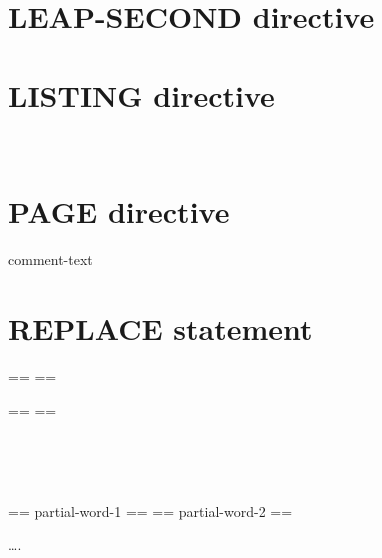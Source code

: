 \begin{0-1}
  \begin{1=}
    \directiveindicator \\
    \miscext{\textdollar}
  \end{1=}
   \sourcetext
\end{0-1}

\begin{0-1}
  \directiveindicator{} \\
\end{0-1}


\section{LEAP-SECOND directive}


\section{LISTING directive}

\directiveindicator{}
\begin{1=}
   \\
\end{1=}

\section{PAGE directive}

\directiveindicator{}
\begin{0-1}
  comment-text
\end{0-1}

\section{REPLACE statement}

\begin{0-1}
\end{0-1}
\begin{1=}
  \begin{1=}
    == \pseudotext == \\
    \identifier
  \end{1=}
  \begin{1=}
    == \pseudotext == \\
    \identifier
  \end{1=} \\

  \begin{1=}
     \\
  \end{1=}
  == partial-word-1 ==
  == partial-word-2 ==
\end{1=}\ldots .

